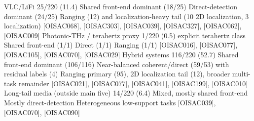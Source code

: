 {}\markdownRendererPipe{} VLC/LiFi \markdownRendererPipe{} 25/220 (11.4\markdownRendererPercentSign{}) \markdownRendererPipe{} Shared front-end dominant (18/25) \markdownRendererPipe{} Direct-detection dominant (24/25) \markdownRendererPipe{} Ranging (12) and localization-heavy tail (10 2D localization, 3 localization) \markdownRendererPipe{} [O\markdownRendererUnderscore{}ISAC\markdownRendererUnderscore{}068], [O\markdownRendererUnderscore{}ISAC\markdownRendererUnderscore{}303], [O\markdownRendererUnderscore{}ISAC\markdownRendererUnderscore{}039], [O\markdownRendererUnderscore{}ISAC\markdownRendererUnderscore{}327], [O\markdownRendererUnderscore{}ISAC\markdownRendererUnderscore{}062], [O\markdownRendererUnderscore{}ISAC\markdownRendererUnderscore{}009] \markdownRendererPipe{}\markdownRendererSoftLineBreak
{}\markdownRendererPipe{} Photonic-THz / terahertz proxy \markdownRendererPipe{} 1/220 (0.5\markdownRendererPercentSign{}) explicit terahertz class \markdownRendererPipe{} Shared front-end (1/1) \markdownRendererPipe{} Direct (1/1) \markdownRendererPipe{} Ranging (1/1) \markdownRendererPipe{} [O\markdownRendererUnderscore{}ISAC\markdownRendererUnderscore{}016], [O\markdownRendererUnderscore{}ISAC\markdownRendererUnderscore{}077], [O\markdownRendererUnderscore{}ISAC\markdownRendererUnderscore{}105], [O\markdownRendererUnderscore{}ISAC\markdownRendererUnderscore{}070], [O\markdownRendererUnderscore{}ISAC\markdownRendererUnderscore{}029] \markdownRendererPipe{}\markdownRendererSoftLineBreak
{}\markdownRendererPipe{} Hybrid systems \markdownRendererPipe{} 116/220 (52.7\markdownRendererPercentSign{}) \markdownRendererPipe{} Shared front-end dominant (106/116) \markdownRendererPipe{} Near-balanced coherent/direct (59/53) with residual labels (4) \markdownRendererPipe{} Ranging primary (95), 2D localization tail (12), broader multi-task remainder \markdownRendererPipe{} [O\markdownRendererUnderscore{}ISAC\markdownRendererUnderscore{}021], [O\markdownRendererUnderscore{}ISAC\markdownRendererUnderscore{}077], [O\markdownRendererUnderscore{}ISAC\markdownRendererUnderscore{}041], [O\markdownRendererUnderscore{}ISAC\markdownRendererUnderscore{}199], [O\markdownRendererUnderscore{}ISAC\markdownRendererUnderscore{}010] \markdownRendererPipe{}\markdownRendererSoftLineBreak
{}\markdownRendererPipe{} Long-tail media (outside main five) \markdownRendererPipe{} 14/220 (6.4\markdownRendererPercentSign{}) \markdownRendererPipe{} Mixed, mostly shared front-end \markdownRendererPipe{} Mostly direct-detection \markdownRendererPipe{} Heterogeneous low-support tasks \markdownRendererPipe{} [O\markdownRendererUnderscore{}ISAC\markdownRendererUnderscore{}039], [O\markdownRendererUnderscore{}ISAC\markdownRendererUnderscore{}070], [O\markdownRendererUnderscore{}ISAC\markdownRendererUnderscore{}090] \markdownRendererPipe{}\markdownRendererInterblockSeparator

